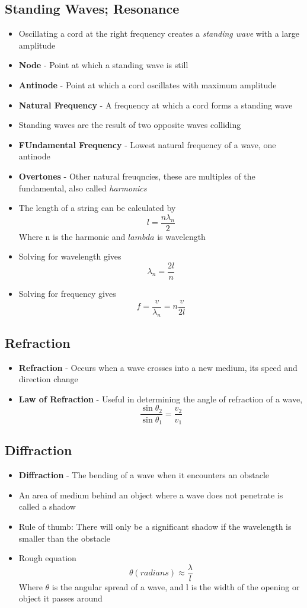\subsection{Standing Waves; Resonance}
\begin{itemize}
    \item Oscillating a cord at the right frequency creates a \emph{standing wave} with a large amplitude
    \item \textbf{Node} - Point at which a standing wave is still
    \item \textbf{Antinode} - Point at which a cord oscillates with maximum amplitude
    \item \textbf{Natural Frequency} - A frequency at which a cord forms a standing wave
    \item Standing waves are the result of two opposite waves colliding
    \item \textbf{FUndamental Frequency} - Lowest natural frequency of a wave, one antinode
    \item \textbf{Overtones} - Other natural freuqncies, these are multiples of the fundamental, also called \emph{harmonics}
    \item The length of a string can be calculated by \[l=\frac{n\lambda_n}{2}\] Where n is the harmonic and \(lambda\) is wavelength
    \item Solving for wavelength gives \[\lambda_n=\frac{2l}{n}\] 
    \item Solving for frequency gives \[f=\frac{v}{\lambda_n}=n\frac{v}{2l}\]
\end{itemize}

\subsection{Refraction}
\begin{itemize}
    \item \textbf{Refraction} - Occurs when a wave crosses into a new medium, its speed and direction change
    \item \textbf{Law of Refraction} - Useful in determining the angle of refraction of a wave, \[\frac{\sin\theta_2}{\sin\theta_1}=\frac{v_2}{v_1}\]
\end{itemize}

\subsection{Diffraction}
\begin{itemize}
    \item \textbf{Diffraction} - The bending of a wave when it encounters an obstacle
    \item An area of medium behind an object where a wave does not penetrate is called a shadow
    \item Rule of thumb: There will only be a significant shadow if the wavelength is smaller than the obstacle
    \item Rough equation \[\theta(radians)\approx\frac{\lambda}{l}\] Where \(\theta\) is the angular spread of a wave, and l is the width of the opening or object it passes around
\end{itemize}

